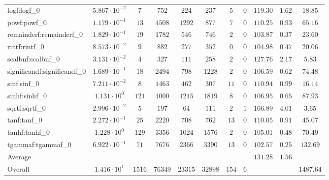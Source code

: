 \begin{tabular}{|l|c|c|c|c|c|c|c|c|c|c|}
logf:logf\_0                 & $ 5.867 \cdot 10^{-2} $ & $ 7      $ & $ 752   $ & $ 224   $ & $ 237   $ & $ 5   $ & $ 0 $ & $ 119.30      $ & $ 1.62    $ & $ 18.85   $ \\
powf:powf\_0                 & $ 1.179 \cdot 10^{-1} $ & $ 13     $ & $ 4508  $ & $ 1292  $ & $ 877   $ & $ 7   $ & $ 0 $ & $ 110.25      $ & $ 0.93    $ & $ 65.16   $ \\
remainderf:remainderf\_0     & $ 1.829 \cdot 10^{-1} $ & $ 19     $ & $ 1782  $ & $ 546   $ & $ 746   $ & $ 2   $ & $ 0 $ & $ 103.87      $ & $ 0.37    $ & $ 23.60   $ \\
rintf:rintf\_0               & $ 8.573 \cdot 10^{-2} $ & $ 9      $ & $ 882   $ & $ 277   $ & $ 352   $ & $ 0   $ & $ 0 $ & $ 104.98      $ & $ 0.47    $ & $ 20.06   $ \\
scalbnf:scalbnf\_0           & $ 3.131 \cdot 10^{-2} $ & $ 4      $ & $ 327   $ & $ 111   $ & $ 258   $ & $ 2   $ & $ 0 $ & $ 127.76      $ & $ 2.17    $ & $ 5.83    $ \\
significandf:significandf\_0 & $ 1.689 \cdot 10^{-1} $ & $ 18     $ & $ 2494  $ & $ 798   $ & $ 1228  $ & $ 2   $ & $ 0 $ & $ 106.59      $ & $ 0.62    $ & $ 74.48   $ \\
sinf:sinf\_0                 & $ 7.211 \cdot 10^{-2} $ & $ 8      $ & $ 1463  $ & $ 462   $ & $ 307   $ & $ 11  $ & $ 0 $ & $ 110.94      $ & $ 0.99    $ & $ 16.14   $ \\
sinhf:sinhf\_0               & $ 1.131 \cdot 10^{0}  $ & $ 121    $ & $ 4000  $ & $ 1215  $ & $ 1819  $ & $ 8   $ & $ 0 $ & $ 106.95      $ & $ 0.65    $ & $ 87.93   $ \\
sqrtf:sqrtf\_0               & $ 2.996 \cdot 10^{-2} $ & $ 5      $ & $ 197   $ & $ 64    $ & $ 111   $ & $ 2   $ & $ 1 $ & $ 166.89      $ & $ 4.01    $ & $ 3.65    $ \\
tanf:tanf\_0                 & $ 2.272 \cdot 10^{-1} $ & $ 25     $ & $ 2220  $ & $ 708   $ & $ 762   $ & $ 13  $ & $ 0 $ & $ 110.05      $ & $ 0.91    $ & $ 45.07   $ \\
tanhf:tanhf\_0               & $ 1.228 \cdot 10^{0}  $ & $ 129    $ & $ 3356  $ & $ 1024  $ & $ 1576  $ & $ 2   $ & $ 0 $ & $ 105.01      $ & $ 0.48    $ & $ 70.49   $ \\
tgammaf:tgammaf\_0           & $ 6.922 \cdot 10^{-1} $ & $ 71     $ & $ 7676  $ & $ 2366  $ & $ 3390  $ & $ 13  $ & $ 0 $ & $ 102.57      $ & $ 0.25    $ & $ 132.69  $ \\
\hline
Average                      & $                     $ & $        $ & $       $ & $       $ & $       $ & $     $ & $   $ & $ 131.28      $ & $ 1.56    $ & $         $ \\
\hline
Overall                      & $ 1.416 \cdot 10^{1}  $ & $ 1516   $ & $ 76349 $ & $ 23315 $ & $ 32898 $ & $ 154 $ & $ 6 $ & $             $ & $         $ & $ 1487.64 $ \\
\hline
\end{tabular}

